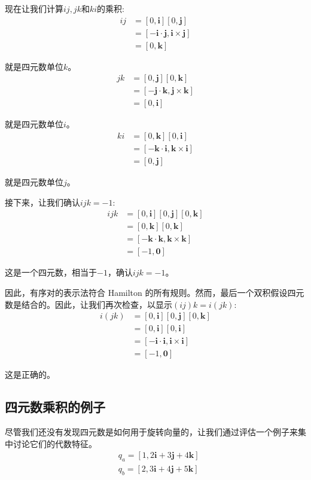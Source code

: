 现在让我们计算$i j, jk $和$k i$的乘积:
$$
\begin{aligned}
i j & =[0, \mathbf{i}][0, \mathbf{j}] \\
& =[-\mathbf{i} \cdot \mathbf{j}, \mathbf{i} \times \mathbf{j}] \\
& =[0, \mathbf{k}]
\end{aligned}
$$

就是四元数单位$k$。
$$
\begin{aligned}
j k & =[0, \mathbf{j}][0, \mathbf{k}] \\
& =[-\mathbf{j} \cdot \mathbf{k}, \mathbf{j} \times \mathbf{k}] \\
& =[0, \mathbf{i}]
\end{aligned}
$$

就是四元数单位$i$。
$$
\begin{aligned}
k i & =[0, \mathbf{k}][0, \mathbf{i}] \\
& =[-\mathbf{k} \cdot \mathbf{i}, \mathbf{k} \times \mathbf{i}] \\
& =[0, \mathbf{j}]
\end{aligned}
$$

就是四元数单位$j$。

接下来，让我们确认$i j k=-1$:
$$
\begin{aligned}
i j k & =[0, \mathbf{i}][0, \mathbf{j}][0, \mathbf{k}] \\
& =[0, \mathbf{k}][0, \mathbf{k}] \\
& =[-\mathbf{k} \cdot \mathbf{k}, \mathbf{k} \times \mathbf{k}] \\
& =[-1, \mathbf{0}]
\end{aligned}
$$

这是一个四元数，相当于$-1$，确认$ ij k=-1$。

因此，有序对的表示法符合 Hamilton 的所有规则。然而，最后一个双积假设四元数是结合的。因此，让我们再次检查，以显示$(i j) k=i(j k)$:
$$
\begin{aligned}
i(j k) & =[0, \mathbf{i}][0, \mathbf{j}][0, \mathbf{k}] \\
& =[0, \mathbf{i}][0, \mathbf{i}] \\
& =[-\mathbf{i} \cdot \mathbf{i}, \mathbf{i} \times \mathbf{i}] \\
& =[-1, \mathbf{0}]
\end{aligned}
$$

这是正确的。

\subsection{四元数乘积的例子}
尽管我们还没有发现四元数是如何用于旋转向量的，让我们通过评估一个例子来集中讨论它们的代数特征。
$$
\begin{aligned}
& q_{a}=[1,2 \mathbf{i}+3 \mathbf{j}+4 \mathbf{k}] \\
& q_{b}=[2,3 \mathbf{i}+4 \mathbf{j}+5 \mathbf{k}]
\end{aligned}
$$

